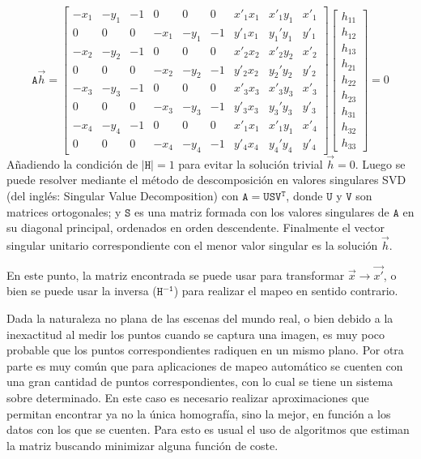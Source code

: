 \begin{displaymath}
\mathtt{A}\vec{h}=
\begin{bmatrix}
-x_1&-y_1&-1&0&0&0&x'_1x_1&x'_1y_1&x'_1\\
0&0&0&-x_1&-y_1&-1&y'_1x_1&y_1'y_1&y'_1\\
-x_2&-y_2&-1&0&0&0&x'_2x_2&x'_2y_2&x'_2\\
0&0&0&-x_2&-y_2&-1&y'_2x_2&y_2'y_2&y'_2\\
-x_3&-y_3&-1&0&0&0&x'_3x_3&x'_3y_3&x'_3\\
0&0&0&-x_3&-y_3&-1&y'_3x_3&y_3'y_3&y'_3\\
-x_4&-y_4&-1&0&0&0&x'_1x_1&x'_1y_1&x'_4\\
0&0&0&-x_4&-y_4&-1&y'_4x_4&y_4'y_4&y'_4
\end{bmatrix}
\begin{bmatrix}
h_{11}\\h_{12}\\h_{13}\\h_{21}\\h_{22}\\h_{23}\\h_{31}\\h_{32}\\h_{33}
\end{bmatrix}
= 0
\end{displaymath}
Añadiendo la condición de 	 $\left | \mathtt{H} \right | = 1$ para evitar la solución trivial $\vec{h}=0$. Luego se puede resolver mediante el método de descomposición en valores singulares SVD (del inglés: Singular Value Decomposition) con $\mathtt{A} = \mathtt{U}\mathtt{S}\mathtt{V}^\mathtt{T}$, donde $\mathtt{U}$ y $\mathtt{V}$ son matrices ortogonales; y $\mathtt{S}$ es una matriz formada con los valores singulares de $\mathtt{A}$ en su diagonal principal, ordenados en orden descendente. Finalmente el vector singular unitario correspondiente con el menor valor singular es la solución $\vec{h}$.

En este punto, la matriz encontrada se puede usar para transformar $\vec{x} \to \vec{x'}$, o bien se puede usar la inversa ($\mathtt{H^{-1}}$) para realizar el mapeo en sentido contrario.

Dada la naturaleza no plana de las escenas del mundo real, o bien debido a la inexactitud al medir los puntos cuando se captura una imagen, es muy poco probable que los puntos correspondientes radiquen en un mismo plano. Por otra parte es muy común que para aplicaciones de mapeo automático se cuenten con una gran cantidad de puntos correspondientes, con lo cual se tiene un sistema sobre determinado. En este caso es necesario realizar aproximaciones que permitan encontrar ya no la única homografía, sino la mejor, en función a los datos con los que se cuenten. Para esto es usual el uso de algoritmos que estiman la matriz buscando minimizar alguna función de coste.

